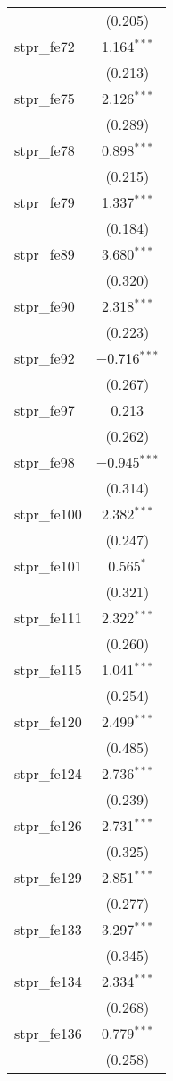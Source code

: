 \begin{table}[!htbp]
\begin{tabular}{@{\extracolsep{5pt}}lc}
  & (0.205) \\ 
  stpr\_fe72 & 1.164$^{***}$ \\ 
  & (0.213) \\ 
  stpr\_fe75 & 2.126$^{***}$ \\ 
  & (0.289) \\ 
  stpr\_fe78 & 0.898$^{***}$ \\ 
  & (0.215) \\ 
  stpr\_fe79 & 1.337$^{***}$ \\ 
  & (0.184) \\ 
  stpr\_fe89 & 3.680$^{***}$ \\ 
  & (0.320) \\ 
  stpr\_fe90 & 2.318$^{***}$ \\ 
  & (0.223) \\ 
  stpr\_fe92 & $-$0.716$^{***}$ \\ 
  & (0.267) \\ 
  stpr\_fe97 & 0.213 \\ 
  & (0.262) \\ 
  stpr\_fe98 & $-$0.945$^{***}$ \\ 
  & (0.314) \\ 
  stpr\_fe100 & 2.382$^{***}$ \\ 
  & (0.247) \\ 
  stpr\_fe101 & 0.565$^{*}$ \\ 
  & (0.321) \\ 
  stpr\_fe111 & 2.322$^{***}$ \\ 
  & (0.260) \\ 
  stpr\_fe115 & 1.041$^{***}$ \\ 
  & (0.254) \\ 
  stpr\_fe120 & 2.499$^{***}$ \\ 
  & (0.485) \\ 
  stpr\_fe124 & 2.736$^{***}$ \\ 
  & (0.239) \\ 
  stpr\_fe126 & 2.731$^{***}$ \\ 
  & (0.325) \\ 
  stpr\_fe129 & 2.851$^{***}$ \\ 
  & (0.277) \\ 
  stpr\_fe133 & 3.297$^{***}$ \\ 
  & (0.345) \\ 
  stpr\_fe134 & 2.334$^{***}$ \\ 
  & (0.268) \\ 
  stpr\_fe136 & 0.779$^{***}$ \\ 
  & (0.258) \\ 

\end{tabular}
\end{table}
